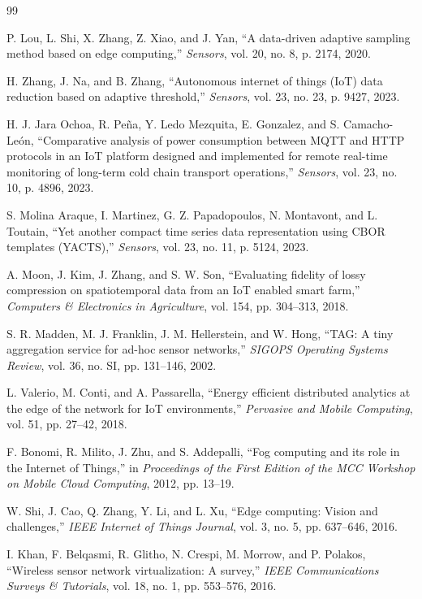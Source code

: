 \documentclass[10pt,twocolumn]{article}
\begin{document}
\begin{thebibliography}{99}

 P. Lou, L. Shi, X. Zhang, Z. Xiao, and J. Yan, ``A data-driven adaptive sampling method based on edge computing,'' \textit{Sensors}, vol. 20, no. 8, p. 2174, 2020.

 H. Zhang, J. Na, and B. Zhang, ``Autonomous internet of things (IoT) data reduction based on adaptive threshold,'' \textit{Sensors}, vol. 23, no. 23, p. 9427, 2023.

 H. J. Jara Ochoa, R. Peña, Y. Ledo Mezquita, E. Gonzalez, and S. Camacho-León, ``Comparative analysis of power consumption between MQTT and HTTP protocols in an IoT platform designed and implemented for remote real-time monitoring of long-term cold chain transport operations,'' \textit{Sensors}, vol. 23, no. 10, p. 4896, 2023.

 S. Molina Araque, I. Martinez, G. Z. Papadopoulos, N. Montavont, and L. Toutain, ``Yet another compact time series data representation using CBOR templates (YACTS),'' \textit{Sensors}, vol. 23, no. 11, p. 5124, 2023.

 A. Moon, J. Kim, J. Zhang, and S. W. Son, ``Evaluating fidelity of lossy compression on spatiotemporal data from an IoT enabled smart farm,'' \textit{Computers \& Electronics in Agriculture}, vol. 154, pp. 304--313, 2018.

 S. R. Madden, M. J. Franklin, J. M. Hellerstein, and W. Hong, ``TAG: A tiny aggregation service for ad-hoc sensor networks,'' \textit{SIGOPS Operating Systems Review}, vol. 36, no. SI, pp. 131--146, 2002.

 L. Valerio, M. Conti, and A. Passarella, ``Energy efficient distributed analytics at the edge of the network for IoT environments,'' \textit{Pervasive and Mobile Computing}, vol. 51, pp. 27--42, 2018.

 F. Bonomi, R. Milito, J. Zhu, and S. Addepalli, ``Fog computing and its role in the Internet of Things,'' in \textit{Proceedings of the First Edition of the MCC Workshop on Mobile Cloud Computing}, 2012, pp. 13--19.

 W. Shi, J. Cao, Q. Zhang, Y. Li, and L. Xu, ``Edge computing: Vision and challenges,'' \textit{IEEE Internet of Things Journal}, vol. 3, no. 5, pp. 637--646, 2016.

 I. Khan, F. Belqasmi, R. Glitho, N. Crespi, M. Morrow, and P. Polakos, ``Wireless sensor network virtualization: A survey,'' \textit{IEEE Communications Surveys \& Tutorials}, vol. 18, no. 1, pp. 553--576, 2016.


\end{thebibliography}
\end{document}

